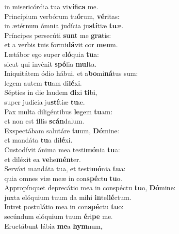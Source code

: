 \oddverse in misericórdia tua vi\textbf{ví}fi\textbf{ca} me.\\
\evenverse Princípium verbórum tu\textbf{ó}rum, \textbf{vé}ritas:~\*\\
\evenverse in ætérnum ómnia judícia ju\textbf{stí}tiæ \textbf{tu}æ.\\
\oddverse Príncipes persecúti \textbf{sunt} me \textbf{gra}tis:~\*\\
\oddverse et a verbis tuis formi\textbf{dá}vit cor \textbf{me}um.\\
\evenverse Lætábor ego super e\textbf{ló}quia \textbf{tu}a:~\*\\
\evenverse sicut qui invénit \textbf{spó}lia \textbf{mul}ta.\\
\oddverse Iniquitátem ódio hábui, et a\textbf{bo}mi\textbf{ná}tus sum:~\*\\
\oddverse legem autem \textbf{tu}am di\textbf{lé}xi.\\
\evenverse Sépties in die laudem \textbf{di}xi \textbf{ti}bi,~\*\\
\evenverse super judícia ju\textbf{stí}tiæ \textbf{tu}æ.\\
\oddverse Pax multa diligéntibus \textbf{le}gem \textbf{tu}am:~\*\\
\oddverse et non est \textbf{il}lis \textbf{scán}dalum.\\
\evenverse Exspectábam salutáre \textbf{tu}um, \textbf{Dó}mine:~\*\\
\evenverse et mandáta \textbf{tu}a di\textbf{lé}xi.\\
\oddverse Custodívit ánima mea testi\textbf{mó}nia \textbf{tu}a:~\*\\
\oddverse et diléxit ea \textbf{ve}he\textbf{mén}ter.\\
\evenverse Servávi mandáta tua, et testi\textbf{mó}nia \textbf{tu}a:~\*\\
\evenverse quia omnes viæ meæ in con\textbf{spé}ctu \textbf{tu}o.\\
\oddverse Appropínquet deprecátio mea in conspéctu \textbf{tu}o, \textbf{Dó}mine:~\*\\
\oddverse juxta elóquium tuum da mihi \textbf{in}tel\textbf{lé}ctum.\\
\evenverse Intret postulátio mea in con\textbf{spé}ctu \textbf{tu}o:~\*\\
\evenverse secúndum elóquium tuum \textbf{é}ri\textbf{pe} me.\\
\oddverse Eructábunt lábia \textbf{me}a \textbf{hym}num,~\*\\
